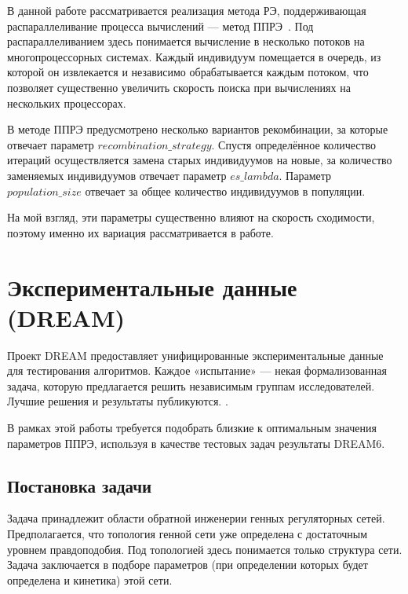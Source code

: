 В данной работе рассматривается реализация метода РЭ, поддерживающая 
распараллеливание процесса вычислений — метод ППРЭ~\cite{bib2,bib5}. 
Под распараллеливанием здесь понимается вычисление в несколько потоков на 
многопроцессорных системах. Каждый индивидуум помещается в очередь, из которой 
он извлекается и независимо обрабатывается каждым потоком, что позволяет 
существенно увеличить скорость поиска при вычислениях на нескольких процессорах.

В методе ППРЭ предусмотрено несколько вариантов рекомбинации, за которые 
отвечает параметр $recombination\_strategy$. Спустя определённое количество 
итераций осуществляется замена старых индивидуумов на новые, за количество 
заменяемых индивидуумов отвечает параметр $es\_lambda$. Параметр 
$population\_size$ отвечает за общее количество индивидуумов в популяции.

На мой взгляд, эти параметры существенно влияют на скорость сходимости, 
поэтому именно их вариация рассматривается в работе.

\clearpage
\section{Экспериментальные данные (DREAM)} \label{s2}

Проект DREAM предоставляет унифицированные экспериментальные данные для 
тестирования алгоритмов. Каждое «испытание» — некая формализованная задача,
которую предлагается решить независимым группам исследователей. 
Лучшие решения и результаты публикуются. \cite{bib6}. 

В рамках этой работы требуется подобрать близкие к оптимальным значения 
параметров ППРЭ, используя в качестве тестовых задач результаты DREAM6.

\subsection{Постановка задачи} \label{s2_1}

Задача принадлежит области обратной инженерии генных регуляторных сетей. 
Предполагается, что топология генной сети уже определена с достаточным уровнем 
правдоподобия. Под топологией здесь понимается только структура сети. Задача 
заключается в подборе параметров (при определении которых будет определена 
и кинетика) этой сети.

